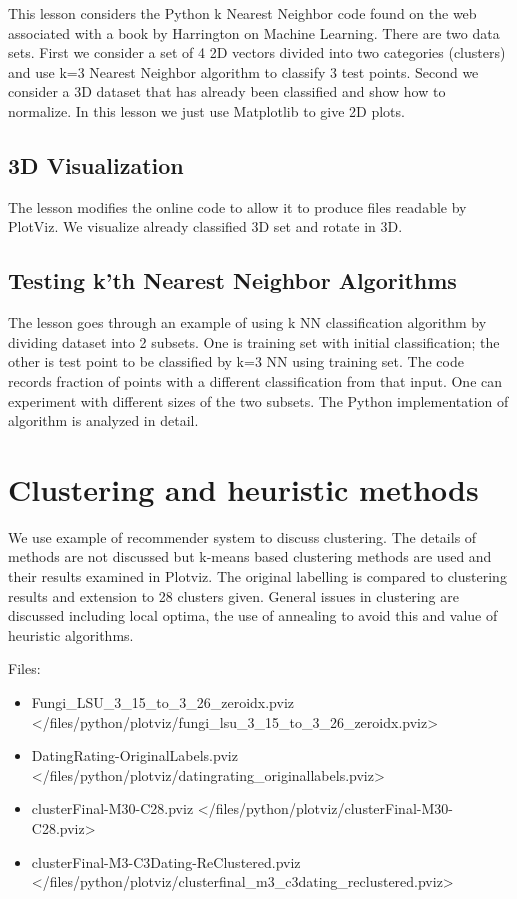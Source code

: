 This lesson considers the Python k Nearest Neighbor code found on the
web associated with a book by Harrington on Machine Learning. There are
two data sets. First we consider a set of 4 2D vectors divided into two
categories (clusters) and use k=3 Nearest Neighbor algorithm to classify
3 test points. Second we consider a 3D dataset that has already been
classified and show how to normalize. In this lesson we just use
Matplotlib to give 2D plots.

\subsection{3D Visualization}\label{d-visualization}

The lesson modifies the online code to allow it to produce files
readable by PlotViz. We visualize already classified 3D set and rotate
in 3D.

\subsection{Testing k'th Nearest Neighbor
Algorithms}\label{testing-kth-nearest-neighbor-algorithms}

The lesson goes through an example of using k NN classification
algorithm by dividing dataset into 2 subsets. One is training set with
initial classification; the other is test point to be classified by k=3
NN using training set. The code records fraction of points with a
different classification from that input. One can experiment with
different sizes of the two subsets. The Python implementation of
algorithm is analyzed in detail.

\section{Clustering and heuristic
methods}\label{clustering-and-heuristic-methods}

We use example of recommender system to discuss clustering. The details
of methods are not discussed but k-means based clustering methods are
used and their results examined in Plotviz. The original labelling is
compared to clustering results and extension to 28 clusters given.
General issues in clustering are discussed including local optima, the
use of annealing to avoid this and value of heuristic algorithms.

Files:

\begin{itemize}

\item
  Fungi\_LSU\_3\_15\_to\_3\_26\_zeroidx.pviz \textless{}/files/python/plotviz/fungi\_lsu\_3\_15\_to\_3\_26\_zeroidx.pviz\textgreater{}
\item
  DatingRating-OriginalLabels.pviz \textless{}/files/python/plotviz/datingrating\_originallabels.pviz\textgreater{}
\item
  clusterFinal-M30-C28.pviz \textless{}/files/python/plotviz/clusterFinal-M30-C28.pviz\textgreater{}
\item
  clusterFinal-M3-C3Dating-ReClustered.pviz \textless{}/files/python/plotviz/clusterfinal\_m3\_c3dating\_reclustered.pviz\textgreater{}
\end{itemize}


